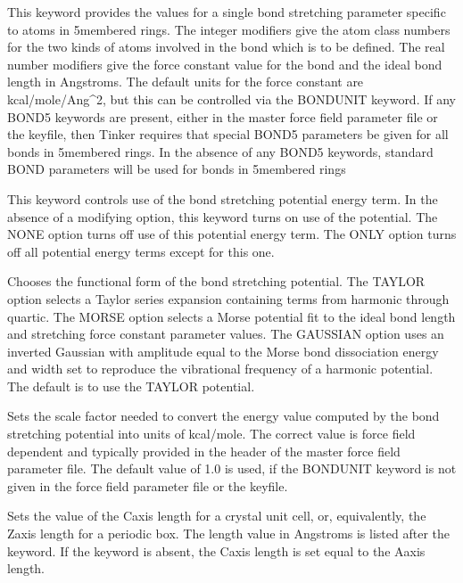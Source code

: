 \documentclass[letterpaper,11pt,english]{sphinxmanual}
\begin{document}
  This keyword provides the values for a single bond stretching parameter specific to atoms in 5\sphinxhyphen{}membered rings. The integer modifiers give the atom class numbers for the two kinds of atoms involved in the bond which is to be defined. The real number modifiers give the force constant value for the bond and the ideal bond length in Angstroms. The default units for the force constant are kcal/mole/Ang\textasciicircum{}2, but this can be controlled via the BONDUNIT keyword. If any BOND5 keywords are present, either in the master force field parameter file or the keyfile, then Tinker requires that special BOND5 parameters be given for all bonds in 5\sphinxhyphen{}membered rings. In the absence of any BOND5 keywords, standard BOND parameters will be used for bonds in 5\sphinxhyphen{}membered rings

  This keyword controls use of the bond stretching potential energy term. In the absence of a modifying option, this keyword turns on use of the potential. The NONE option turns off use of this potential energy term. The ONLY option turns off all potential energy terms except for this one.

  Chooses the functional form of the bond stretching potential. The TAYLOR option selects a Taylor series expansion containing terms from harmonic through quartic. The MORSE option selects a Morse potential fit to the ideal bond length and stretching force constant parameter values. The GAUSSIAN option uses an inverted Gaussian with amplitude equal to the Morse bond dissociation energy and width set to reproduce the vibrational frequency of a harmonic potential. The default is to use the TAYLOR potential.

  Sets the scale factor needed to convert the energy value computed by the bond stretching potential into units of kcal/mole. The correct value is force field dependent and typically provided in the header of the master force field parameter file. The default value of 1.0 is used, if the BONDUNIT keyword is not given in the force field parameter file or the keyfile.


  Sets the value of the C\sphinxhyphen{}axis length for a crystal unit cell, or, equivalently, the Z\sphinxhyphen{}axis length for a periodic box. The length value in Angstroms is listed after the keyword. If the keyword is absent, the C\sphinxhyphen{}axis length is set equal to the A\sphinxhyphen{}axis length.
\end{document}
